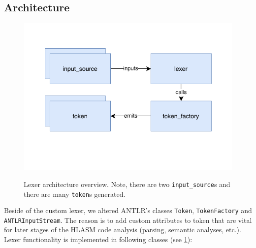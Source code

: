 \subsection{Architecture}

\begin{figure}[H]
	\centering
	\includegraphics{img/lexer_arch}
	\label{lexer_arch}
	\caption{Lexer architecture overview. Note, there are two \texttt{input\_source}s and there are many \texttt{token}s generated.}
\end{figure}

Beside of the custom lexer, we altered ANTLR's classes \texttt{Token}, \texttt{TokenFactory} and \texttt{ANTLRInputStream}. The reason is to add custom attributes to token that are vital for later stages of the HLASM code analysis (parsing, semantic analyses, etc.). Lexer functionality is implemented in following classes (see \cref{lexer_arch}):



